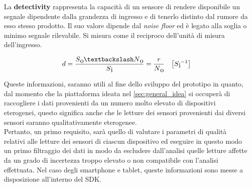 La \textbf{detectivity} rappresenta la capacità di un sensore di rendere disponibile un segnale dipendente dalla grandezza di ingresso e di tenerlo distinto dal rumore da esso stesso prodotto. Il suo valore dipende dal \textit{noise floor} ed è legato alla soglia o minimo segnale rilevabile. Si misura come il reciproco dell'unità di misura dell'ingresso.
\begin{center}
	\begin{equation}
	d = \frac{S\textsubscript{o}\textbackslash N\textsubscript{o}}{S\textsubscript{i}} = \frac{r}{N\textsubscript{o}} \quad \big[S\textsubscript{i} ^{-1}\big]
	\end{equation}
\end{center}
Queste informazioni, saranno utili al fine dello sviluppo del prototipo in quanto, dal momento che la piattaforma ideata nel \autoref{sec:general_idea} si occuperà di raccogliere i dati provenienti da un numero molto elevato di dispositivi eterogenei, questo significa anche che le letture dei sensori provenienti dai diversi sensori saranno qualitativamente eterogenee.\\
Pertanto, un primo requisito, sarà quello di valutare i parametri di qualità relativi alle letture dei sensori di ciascun dispositivo ed eseguire in questo modo un primo filtraggio dei dati in modo da escludere dall'analisi quelle letture affette da un grado di incertezza troppo elevato o non compatibile con l'analisi effettuata. Nel caso degli smartphone e tablet, queste informazioni sono messe a disposizione all'interno del SDK.

